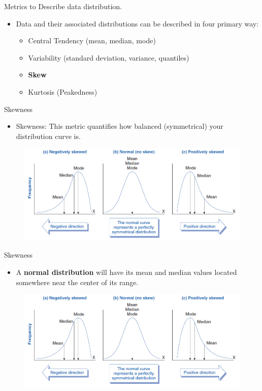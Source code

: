 \documentclass[
  ignorenonframetext,
]{beamer}
\providecommand{\tightlist}{%
  \setlength{\itemsep}{0pt}\setlength{\parskip}{0pt}}
\begin{document}
\begin{frame}{Metrics to Describe data distribution.}
\label{metrics-to-describe-data-distribution.-3}
\begin{itemize}
\item
  Data and their associated distributions can be described in four
  primary way:

  \begin{itemize}
  \tightlist
  \item
    Central Tendency (mean, median, mode)
  \item
    Variability (standard deviation, variance, quantiles)
  \item
    \textbf{Skew}
  \item
    Kurtosis (Peakedness)
  \end{itemize}
\end{itemize}
\end{frame}

\begin{frame}{Skewness}
\label{skewness}
\begin{itemize}
\tightlist
\item
  Skewness: This metric quantifies how balanced (symmetrical) your
  distribution curve is.
\end{itemize}

\begin{figure}
\includegraphics[width=0.8\linewidth]{fig/skewness} \end{figure}
\end{frame}

\begin{frame}{Skewness}
\label{skewness-1}
\begin{itemize}
\tightlist
\item
  A \textbf{normal distribution} will have its mean and median values
  located somewhere near the center of its range.
\end{itemize}

\begin{figure}
\includegraphics[width=0.8\linewidth]{fig/skewness} \end{figure}
\end{frame}
\end{document}
